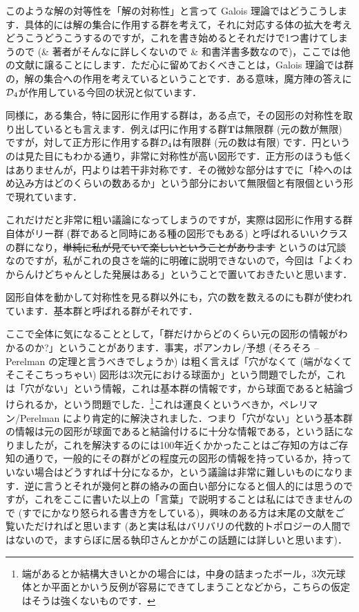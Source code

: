 \documentclass[11pt]{jsarticle}
\begin{document}
このような解の対等性を「解の対称性」と言って Galois 理論ではどうこうします．具体的には解の集合に作用する群を考えて，それに対応する体の拡大を考えどうこうどうこうするのですが，これを書き始めるとそれだけで1つ書けてしまうので (\& 著者がそんなに詳しくないので \& 和書洋書多数なので)，ここでは他の文献に譲ることにします．ただ心に留めておくべきことは，Galois 理論では群の，解の集合への作用を考えているということです．ある意味，魔方陣の答えに$\operatorname{\mathcal{D}}_4$が作用している今回の状況と似ています．

同様に，ある集合，特に図形に作用する群は，ある点で，その図形の対称性を取り出しているとも言えます．例えば円に作用する群$\mathbf{T}$は無限群 (元の数が無限) ですが，対して正方形に作用する群$\operatorname{\mathcal{D}}_4$は有限群 (元の数は有限) です．円というのは見た目にもわかる通り，非常に対称性が高い図形です．正方形のほうも低くはありませんが，円よりは若干非対称です．その微妙な部分はすでに「枠へのはめ込み方はどのくらいの数あるか」という部分において無限個と有限個という形で現れています．

これだけだと非常に粗い議論になってしまうのですが，実際は図形に作用する群自体がリー群 (群であると同時にある種の図形でもある) と呼ばれるいいクラスの群になり，\sout{単純に私が見ていて楽しいということがあります} というのは冗談なのですが，私がこれの良さを端的に明確に説明できないので，今回は「よくわからんけどちゃんとした発展はある」ということで置いておきたいと思います．

図形自体を動かして対称性を見る群以外にも，穴の数を数えるのにも群が使われています．基本群と呼ばれる群がそれです．

ここで全体に気になることとして，「群だけからどのくらい元の図形の情報がわかるのか?」ということがあります．事実，ポアンカレ/\Poincare 予想 (そろそろ {\Poincare}--Perelman の定理と言うべきでしょうか) は粗く言えば「穴がなくて (端がなくてそこそこちっちゃい) 図形は3次元における球面か」という問題でしたが，これは「穴がない」という情報，これは基本群の情報です，から球面であると結論づけられるか，という問題でした．\footnote{端があるとか結構大きいとかの場合には，中身の詰まったボール，3次元球体とか平面とかいう反例が容易にできてしまうことなどから，こちらの仮定はそうは強くないものです．}これは運良くというべきか，ペレリマン/Perelman により肯定的に解決されました．つまり「穴がない」という基本群の情報は元の図形が球面であると結論付けるに十分な情報である，という話になりましたが，これを解決するのには100年近くかかったことはご存知の方はご存知の通りで，一般的にその群がどの程度元の図形の情報を持っているか，持っていない場合はどうすれば十分になるか，という議論は非常に難しいものになります．逆に言うとそれが幾何と群の絡みの面白い部分になると個人的には思うのですが，これをここに書いた以上の「言葉」で説明することは私にはできませんので (すでにかなり怒られる書き方をしている)，興味のある方は末尾の文献をご覧いただければと思います (あと実は私はバリバリの代数的トポロジーの人間ではないので，ますらぼに居る執印さんとかがこの話題には詳しいと思います)．
\end{document}
